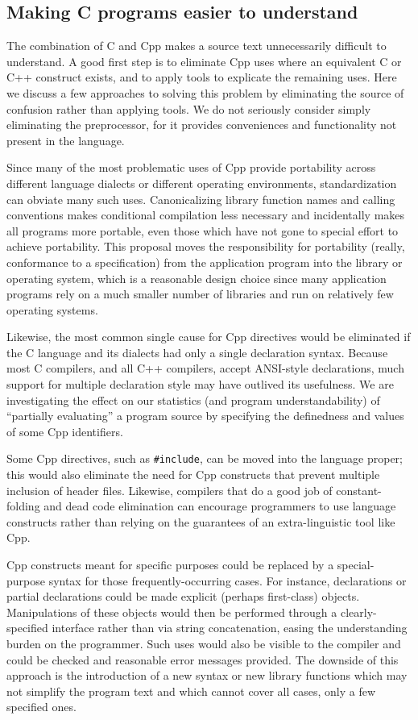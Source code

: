 \documentclass[11pt]{article}
\begin{document}
\subsection{Making C programs easier to understand}

The combination of C and Cpp makes a source text unnecessarily difficult to
understand.  A good first step is to eliminate Cpp uses where an equivalent
C or C++ construct exists, and to apply tools to explicate the remaining
uses.  Here we discuss a few approaches to solving this problem by
eliminating the source of confusion rather than applying tools.  We do not
seriously consider simply eliminating the preprocessor, for it provides
conveniences and functionality not present in the language.

Since many of the most problematic uses of Cpp provide portability across
different language dialects or different operating environments,
standardization can obviate many such uses.  Canonicalizing library
function names and calling conventions makes conditional compilation less
necessary and incidentally makes all programs more portable, even those
which have not gone to special effort to achieve portability.  This
proposal moves the responsibility for portability (really, conformance to a
specification) from the application program into the library or operating
system, which is a reasonable design choice since many application programs
rely on a much smaller number of libraries and run on relatively few
operating systems.

Likewise, the most common single cause for Cpp directives would be
eliminated if the C language and its dialects had only a single declaration
syntax.  Because most C compilers, and all C++ compilers, accept ANSI-style
declarations, much support for multiple declaration style may have outlived
its usefulness.  We are investigating the effect on our statistics (and
program understandability) of ``partially evaluating'' a program source by
specifying the definedness and values of some Cpp identifiers.

Some Cpp directives, such as {\tt \#include}, can be moved into the
language proper; this would also eliminate the need for Cpp constructs that
prevent multiple inclusion of header files.  Likewise, compilers that do a
good job of constant-folding and dead code elimination can encourage
programmers to use language constructs rather than relying on the
guarantees of an extra-linguistic tool like Cpp.

Cpp constructs meant for specific purposes could be replaced by a
special-purpose syntax for those frequently-occurring cases.  For instance,
declarations or partial declarations could be made explicit (perhaps
first-class) objects.  Manipulations of these objects would then be
performed through a clearly-specified interface rather than via string
concatenation, easing the understanding burden on the programmer.  Such
uses would also be visible to the compiler and could be checked and
reasonable error messages provided.  The downside of this approach is the
introduction of a new syntax or new library functions which may not
simplify the program text and which cannot cover all cases, only a few
specified ones.
\end{document}
